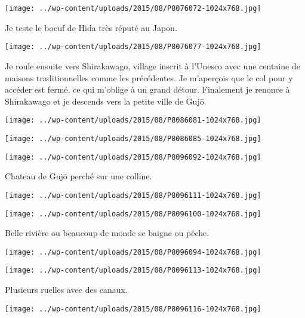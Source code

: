 \centerline{\texttt{[image: ../wp-content/uploads/2015/08/P8076072-1024x768.jpg]} } 
 \newline
 Je teste le boeuf de Hida très réputé au Japon. \newline
 \newline
\centerline{\texttt{[image: ../wp-content/uploads/2015/08/P8076077-1024x768.jpg]} } 
 \newline
 Je roule ensuite vers Shirakawago, village inscrit à l'Unesco avec une centaine de maisons traditionnelles comme les précédentes. Je m'aperçois que le col pour y accéder est fermé, ce qui m'oblige à un grand détour. Finalement je renonce à Shirakawago et je descends vers la petite ville de Gujō. \newline
 \newline
\centerline{\texttt{[image: ../wp-content/uploads/2015/08/P8086081-1024x768.jpg]} } 
 \newline
 \newline
\centerline{\texttt{[image: ../wp-content/uploads/2015/08/P8086085-1024x768.jpg]} } 
 \newline
 \newline
\centerline{\texttt{[image: ../wp-content/uploads/2015/08/P8096092-1024x768.jpg]} } 
 \newline
 Chateau de Gujō perché sur une colline. \newline
 \newline
\centerline{\texttt{[image: ../wp-content/uploads/2015/08/P8096111-1024x768.jpg]} } 
 \newline
 \newline
\centerline{\texttt{[image: ../wp-content/uploads/2015/08/P8096100-1024x768.jpg]} } 
 \newline
 Belle rivière ou beaucoup de monde se baigne ou pêche. \newline
 \newline
\centerline{\texttt{[image: ../wp-content/uploads/2015/08/P8096094-1024x768.jpg]} } 
 \newline
 \newline
\centerline{\texttt{[image: ../wp-content/uploads/2015/08/P8096113-1024x768.jpg]} } 
 \newline
 Plusieurs ruelles avec des canaux. \newline
 \newline
\centerline{\texttt{[image: ../wp-content/uploads/2015/08/P8096116-1024x768.jpg]} } 
